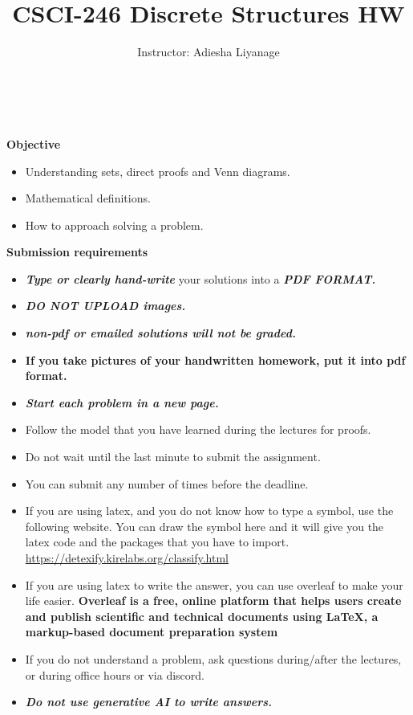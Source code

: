 \documentclass[12pt]{exam}
\title{CSCI-246 Discrete Structures HW \assignmentnumber}
\author{Instructor: Adiesha Liyanage}
\begin{document}
\maketitle

\hrulefill
\\
\\
\textbf{Objective}
\begin{itemize}
    \item Understanding sets, direct proofs and Venn diagrams.
    \item Mathematical definitions.
    \item How to approach solving a problem.
\end{itemize}

\textbf{Submission requirements}
\begin{itemize}
    \item \textbf{\textit{Type or clearly hand-write}} your solutions into a \textbf{\textit{PDF FORMAT.}} 
    \item \textbf{\textit{DO NOT UPLOAD images.}}
    \item \textbf{\textit{non-pdf or emailed solutions will not be graded.}}
    \item \textbf{If you take pictures of your handwritten homework, put it into pdf format.}
    \item \textbf{\textit{Start each problem in a new page.}}
    \item Follow the model that you have learned during the lectures for proofs.
    \item Do not wait until the last minute to submit the assignment.
    \item You can submit any number of times before the deadline. 
    \item If you are using latex, and you do not know how to type a symbol, use the following website. You can draw the symbol here and it will give you the latex code and the packages that you have to import. \url{https://detexify.kirelabs.org/classify.html}
    \item If you are using latex to write the answer, you can use overleaf to make your life easier. \textbf{Overleaf is a free, online platform that helps users create and publish scientific and technical documents using LaTeX, a markup-based document preparation system}
    \item If you do not understand a problem, ask questions during/after the lectures, or during office hours or via discord.
    \item \textbf{\textit{Do not use generative AI to write answers.}} 
\end{itemize}
\end{document}
